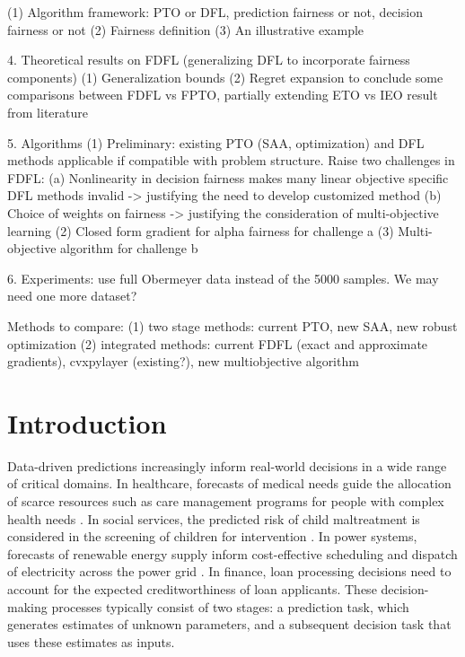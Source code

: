 \documentclass[ijoc,sglanonrev]{informs4}
\begin{document}
{(1) Algorithm framework: PTO or DFL, prediction fairness or not, decision fairness or not
(2) Fairness definition (3) An illustrative example 

4. Theoretical results on FDFL (generalizing DFL to incorporate fairness components) (1) Generalization bounds (2) Regret expansion to conclude some comparisons between FDFL vs FPTO, partially extending ETO vs IEO result from literature 

5. Algorithms (1) Preliminary: existing PTO (SAA, optimization) and DFL methods applicable if compatible with problem structure. Raise two challenges in FDFL: (a) Nonlinearity in decision fairness makes many linear objective specific DFL methods invalid -> justifying the need to develop customized method (b) Choice of weights on fairness -> justifying the consideration of multi-objective learning (2) Closed form gradient for alpha fairness for challenge a (3) Multi-objective algorithm for challenge b 

6. Experiments: use full Obermeyer data instead of the 5000 samples. We may need one more dataset? 

Methods to compare: (1) two stage methods: current PTO, new SAA, new robust optimization (2) integrated methods: current FDFL (exact and approximate gradients), cvxpylayer (existing?), new multiobjective algorithm 
}

\section{Introduction}\label{sec:Intro}
Data-driven predictions increasingly inform real-world decisions in a wide range of critical domains. In healthcare, forecasts of medical needs guide the allocation of scarce resources such as care management programs for people with complex health needs \citep{doi:10.1126/science.aax2342}. In social services, the predicted risk of child maltreatment is considered in the screening of children for intervention \citep{chouldechova2018case}. In power systems, forecasts of renewable energy supply inform cost-effective scheduling and dispatch of electricity across the power grid \citep{chen2021feature}. In finance, loan processing decisions need to account for the expected creditworthiness of loan applicants. These decision-making processes typically consist of two stages: a prediction task, which generates estimates of unknown parameters, and a subsequent decision task that uses these estimates as inputs. %
\end{document}
